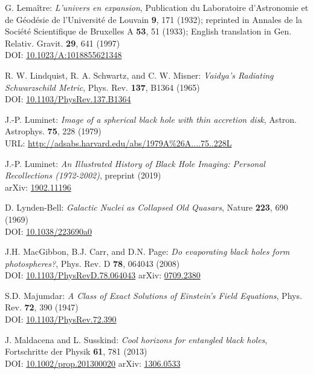 \begin{thebibliography}{123}
G. Lemaître: {\em L'univers en expansion},
Publication du Laboratoire d'Astronomie et de Géodésie de l'Université
de Louvain {\bf 9},  171 (1932); reprinted in
Annales de la Société Scientifique de Bruxelles A {\bf 53}, 51 (1933);
English translation in
Gen. Relativ. Gravit. {\bf 29}, 641 (1997)\\
DOI: \href{https://doi.org/10.1023/A:1018855621348}{10.1023/A:1018855621348}

R. W. Lindquist, R. A. Schwartz, and C. W. Misner:
{\em Vaidya's Radiating Schwarzschild Metric},
Phys. Rev. {\bf 137}, B1364 (1965)\\
DOI: \href{https://doi.org/10.1103/PhysRev.137.B1364}{10.1103/PhysRev.137.B1364}

J.-P. Luminet: {\em Image of a spherical black hole with thin accretion disk},
Astron. Astrophys. {\bf 75}, 228 (1979)\\
URL: \url{http://adsabs.harvard.edu/abs/1979A%26A....75..228L}

J.-P. Luminet:
{\em An Illustrated History of Black Hole Imaging: Personal Recollections (1972-2002)}, preprint (2019)\\
arXiv: \href{https://arxiv.org/abs/1902.11196}{1902.11196}

D. Lynden-Bell:
{\em Galactic Nuclei as Collapsed Old Quasars},
Nature {\bf 223}, 690 (1969)\\
DOI: \href{https://doi.org/10.1038/223690a0}{10.1038/223690a0}

J.H. MacGibbon, B.J. Carr, and D.N. Page:
{\em Do evaporating black holes form photospheres?},
Phys. Rev. D {\bf 78}, 064043 (2008)\\
DOI: \href{https://doi.org/10.1103/PhysRevD.78.064043}{10.1103/PhysRevD.78.064043}\hfill
arXiv: \href{https://arxiv.org/abs/0709.2380}{0709.2380}

S.D. Majumdar:
{\em A Class of Exact Solutions of Einstein's Field Equations},
Phys. Rev. {\bf 72}, 390 (1947)\\
DOI: \href{https://doi.org/10.1103/PhysRev.72.390}{10.1103/PhysRev.72.390}

J. Maldacena and L. Susskind:
{\em Cool horizons for entangled black holes},
Fortschritte der Physik {\bf 61}, 781 (2013)\\
DOI: \href{https://doi.org/10.1002/prop.201300020}{10.1002/prop.201300020}\hfill
arXiv: \href{https://arxiv.org/abs/1306.0533}{1306.0533}


\end{thebibliography}
